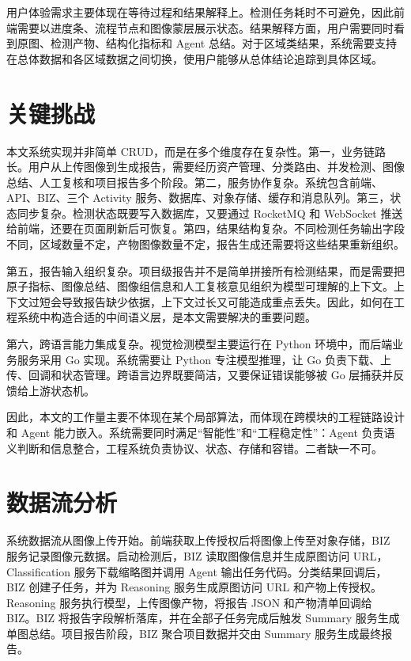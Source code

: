 用户体验需求主要体现在等待过程和结果解释上。检测任务耗时不可避免，因此前端需要以进度条、流程节点和图像蒙层展示状态。结果解释方面，用户需要同时看到原图、检测产物、结构化指标和 Agent 总结。对于区域类结果，系统需要支持在总体数据和各区域数据之间切换，使用户能够从总体结论追踪到具体区域。

\section{关键挑战}
\label{sec:key-challenges}

本文系统实现并非简单 CRUD，而是在多个维度存在复杂性。第一，业务链路长。用户从上传图像到生成报告，需要经历资产管理、分类路由、并发检测、图像总结、人工复核和项目报告多个阶段。第二，服务协作复杂。系统包含前端、API、BIZ、三个 Activity 服务、数据库、对象存储、缓存和消息队列。第三，状态同步复杂。检测状态既要写入数据库，又要通过 RocketMQ 和 WebSocket 推送给前端，还要在页面刷新后可恢复。第四，结果结构复杂。不同检测任务输出字段不同，区域数量不定，产物图像数量不定，报告生成还需要将这些结果重新组织。

第五，报告输入组织复杂。项目级报告并不是简单拼接所有检测结果，而是需要把原子指标、图像总结、图像组信息和人工复核意见组织为模型可理解的上下文。上下文过短会导致报告缺少依据，上下文过长又可能造成重点丢失。因此，如何在工程系统中构造合适的中间语义层，是本文需要解决的重要问题。

第六，跨语言能力集成复杂。视觉检测模型主要运行在 Python 环境中，而后端业务服务采用 Go 实现。系统需要让 Python 专注模型推理，让 Go 负责下载、上传、回调和状态管理。跨语言边界既要简洁，又要保证错误能够被 Go 层捕获并反馈给上游状态机。

因此，本文的工作量主要不体现在某个局部算法，而体现在跨模块的工程链路设计和 Agent 能力嵌入。系统需要同时满足“智能性”和“工程稳定性”：Agent 负责语义判断和信息整合，工程系统负责协议、状态、存储和容错。二者缺一不可。

\section{数据流分析}
\label{sec:data-flow-analysis}

系统数据流从图像上传开始。前端获取上传授权后将图像上传至对象存储，BIZ 服务记录图像元数据。启动检测后，BIZ 读取图像信息并生成原图访问 URL，Classification 服务下载缩略图并调用 Agent 输出任务代码。分类结果回调后，BIZ 创建子任务，并为 Reasoning 服务生成原图访问 URL 和产物上传授权。Reasoning 服务执行模型，上传图像产物，将报告 JSON 和产物清单回调给 BIZ。BIZ 将报告字段解析落库，并在全部子任务完成后触发 Summary 服务生成单图总结。项目报告阶段，BIZ 聚合项目数据并交由 Summary 服务生成最终报告。

